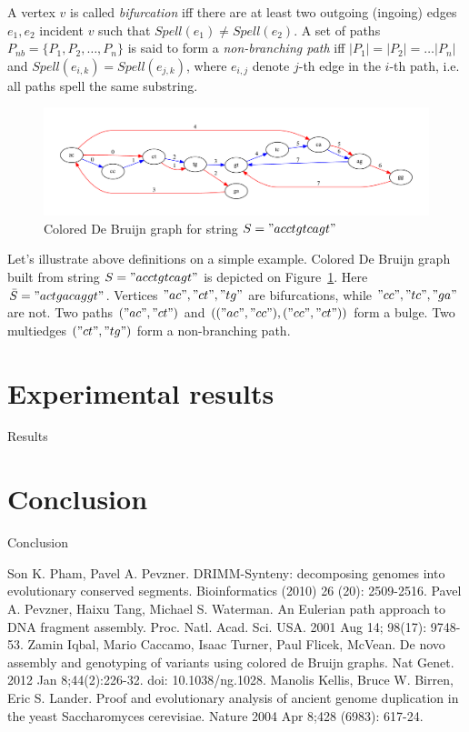 \documentclass[a4paper,12pt]{scrartcl}
\begin{document}
A vertex \(v\) is called \textit{bifurcation} iff there are at least two outgoing (ingoing) edges \(e_{1}, e_{2}\) 
incident \(v\) such that \(Spell(e_{1}) \neq Spell(e_{2})\). A set of paths \(P_{nb} = \lbrace P_{1}, P_{2}, \ldots, P_{n} \rbrace\)
is said to form a \textit{non-branching path} iff \(|P_{1}| = |P_{2}| = \ldots |P_{n}| \) and \(Spell(e_{i, k}) = Spell(e_{j, k}) \),
where \(e_{i, j}\) denote \(j\)-th edge in the \(i\)-th path, i.e. all paths spell the same substring.

\begin{figure}
	\includegraphics[scale = 0.50]{graph3.pdf}
	\small \caption{Colored De Bruijn graph for string \(S = "acctgtcagt" \) }
	\label{ColoredDeBruijn}
\end{figure}

Let's illustrate above definitions on a simple example. Colored De Bruijn graph built from string \(S = "acctgtcagt"\)
is depicted on Figure~\ref{ColoredDeBruijn}. Here \(\bar{S} = "actgacaggt"\). Vertices \("ac", "ct", "tg"\) are 
bifurcations, while \("cc", "tc", "ga"\) are not. Two paths \(("ac", "ct")\) and \((("ac", "cc"), ("cc", "ct"))\) form a bulge.
Two multiedges \(("ct", "tg")\) form a non-branching path.

\section{Experimental results}
Results
\section{Conclusion}
Conclusion

\begin{thebibliography}{9}
	Son K. Pham, Pavel A. Pevzner.
	DRIMM-Synteny: decomposing genomes into evolutionary conserved segments.
	Bioinformatics (2010)  26  (20):  2509-2516.
	Pavel A. Pevzner, Haixu Tang, Michael S. Waterman.
	An Eulerian path approach to DNA fragment assembly.
	Proc. Natl. Acad. Sci. USA. 2001 Aug 14; 98(17): 9748-53.
	Zamin Iqbal, Mario Caccamo, Isaac Turner, Paul Flicek, McVean.
	De novo assembly and genotyping of variants using colored de Bruijn graphs.
	Nat Genet. 2012 Jan 8;44(2):226-32. doi: 10.1038/ng.1028.
	Manolis Kellis, Bruce W. Birren, Eric S. Lander.
	Proof and evolutionary analysis of ancient genome duplication in the yeast Saccharomyces cerevisiae.
	Nature 2004 Apr 8;428 (6983): 617-24.
\end{thebibliography}
\end{document}
